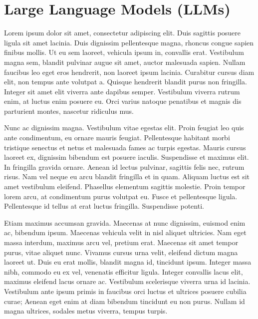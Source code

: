 \documentclass[
  a4paper,
  DIV=11,
  numbers=noendperiod]{scrreprt}
\begin{document}
\section{Large Language Models (LLMs)}\label{large-language-models-llms}

Lorem ipsum dolor sit amet, consectetur adipiscing elit. Duis sagittis
posuere ligula sit amet lacinia. Duis dignissim pellentesque magna,
rhoncus congue sapien finibus mollis. Ut eu sem laoreet, vehicula ipsum
in, convallis erat. Vestibulum magna sem, blandit pulvinar augue sit
amet, auctor malesuada sapien. Nullam faucibus leo eget eros hendrerit,
non laoreet ipsum lacinia. Curabitur cursus diam elit, non tempus ante
volutpat a. Quisque hendrerit blandit purus non fringilla. Integer sit
amet elit viverra ante dapibus semper. Vestibulum viverra rutrum enim,
at luctus enim posuere eu. Orci varius natoque penatibus et magnis dis
parturient montes, nascetur ridiculus mus.

Nunc ac dignissim magna. Vestibulum vitae egestas elit. Proin feugiat
leo quis ante condimentum, eu ornare mauris feugiat. Pellentesque
habitant morbi tristique senectus et netus et malesuada fames ac turpis
egestas. Mauris cursus laoreet ex, dignissim bibendum est posuere
iaculis. Suspendisse et maximus elit. In fringilla gravida ornare.
Aenean id lectus pulvinar, sagittis felis nec, rutrum risus. Nam vel
neque eu arcu blandit fringilla et in quam. Aliquam luctus est sit amet
vestibulum eleifend. Phasellus elementum sagittis molestie. Proin tempor
lorem arcu, at condimentum purus volutpat eu. Fusce et pellentesque
ligula. Pellentesque id tellus at erat luctus fringilla. Suspendisse
potenti.

Etiam maximus accumsan gravida. Maecenas at nunc dignissim, euismod enim
ac, bibendum ipsum. Maecenas vehicula velit in nisl aliquet ultricies.
Nam eget massa interdum, maximus arcu vel, pretium erat. Maecenas sit
amet tempor purus, vitae aliquet nunc. Vivamus cursus urna velit,
eleifend dictum magna laoreet ut. Duis eu erat mollis, blandit magna id,
tincidunt ipsum. Integer massa nibh, commodo eu ex vel, venenatis
efficitur ligula. Integer convallis lacus elit, maximus eleifend lacus
ornare ac. Vestibulum scelerisque viverra urna id lacinia. Vestibulum
ante ipsum primis in faucibus orci luctus et ultrices posuere cubilia
curae; Aenean eget enim at diam bibendum tincidunt eu non purus. Nullam
id magna ultrices, sodales metus viverra, tempus turpis.
\end{document}
